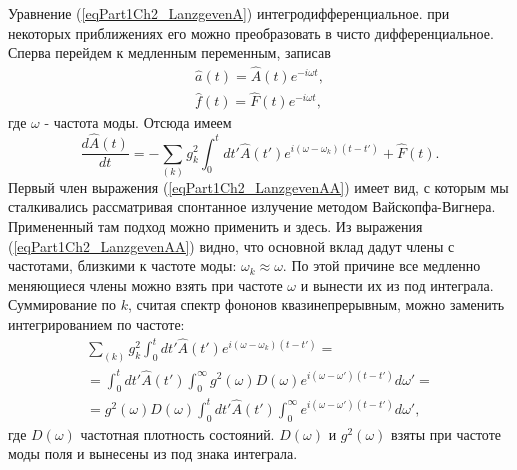 Уравнение (\ref{eqPart1Ch2_LanzgevenA}) интегродифференциальное. при
некоторых приближениях его можно преобразовать в чисто
дифференциальное. Сперва перейдем к медленным переменным, записав
\begin{eqnarray}
\hat{a}\left(t\right) = \hat{A}\left(t\right)e^{-i \omega t},
\nonumber \\
\hat{f}\left(t\right) = \hat{F}\left(t\right)e^{-i \omega t},
\nonumber
\end{eqnarray}
где $\omega$ - частота моды. Отсюда имеем
\begin{equation}
\frac{d \hat{A}\left(t\right)}{dt} = 
- \sum_{(k)} g_k^2 \int_0^t
d t'  \hat{A}\left(t'\right)e^{i \left(\omega -
  \omega_k\right)\left(t - t'\right)} 
+ \hat{F}\left(t\right).
\label{eqPart1Ch2_LanzgevenAA}
\end{equation}
Первый член выражения (\ref{eqPart1Ch2_LanzgevenAA}) имеет вид, с которым мы
сталкивались рассматривая спонтанное излучение методом
Вайскопфа-Вигнера. Примененный там подход можно применить и здесь. Из
выражения (\ref{eqPart1Ch2_LanzgevenAA}) видно, что основной вклад
дадут члены с частотами, близкими к частоте моды: $\omega_k \approx
\omega$. По этой причине все медленно меняющиеся члены можно взять при
частоте $\omega$ и вынести их из под интеграла. Суммирование по $k$,
считая спектр фононов квазинепрерывным, можно заменить интегрированием
по частоте:
\begin{eqnarray}
\sum_{(k)}g_k^2\int_0^t d t' \hat{A}\left(t'\right) e^{i\left(\omega -
  \omega_k\right)\left(t - t'\right)} = 
\nonumber \\
=
\int_0^t d t'
  \hat{A}\left(t'\right)\int_0^{\infty}g^2\left(\omega\right) 
D\left(\omega\right) e^{i\left(\omega -
  \omega'\right)\left(t - t'\right)} d \omega' = 
\nonumber \\
= g^2\left(\omega\right) 
D\left(\omega\right)
\int_0^t d t'
  \hat{A}\left(t'\right)
\int_0^{\infty}e^{i\left(\omega -
  \omega'\right)\left(t - t'\right)} d \omega',
\nonumber
\end{eqnarray}
где $D\left(\omega\right)$ частотная плотность состояний.
$D\left(\omega\right)$ и $g^2\left(\omega\right)$ взяты при частоте
моды поля и вынесены из под знака интеграла.

